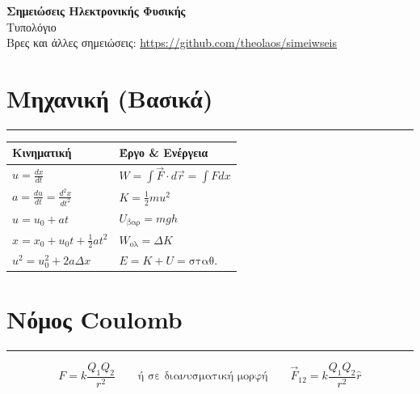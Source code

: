 \documentclass[a4paper,12pt]{article}
\begin{document}
\begin{center}
    \LARGE \textbf{Σημειώσεις Ηλεκτρονικής Φυσικής}\\[0.5ex]
    \large Τυπολόγιο \\
    \normalsize Βρες και άλλες σημειώσεις: \url{https://github.com/theolaos/simeiwseis}
\end{center}

\section*{Μηχανική (Βασικά)}
\vspace{-.4cm}
\hrule
\vspace{0.3cm}

\begin{table}[h!]
\centering
\begin{tabular}{|l|l|}
\hline
\textbf{Κινηματική} & \textbf{Έργο \& Ενέργεια} \\ \hline
$u = \frac{dx}{dt}$ & $W = \int \vec{F} \cdot d\vec{r} = \int F dx$ \\
$a = \frac{du}{dt} = \frac{d^2x}{dt^2}$ & $K = \frac{1}{2}m u^2$ \\
$u = u_0 + at$ & $U_{\text{βαρ}} = mgh$ \\
$x = x_0 + u_0 t + \frac{1}{2}at^2$ & $W_{\text{ολ}} = \Delta K$ \\
$u^2 = u_0^2 + 2a\Delta x$ & $E = K + U = \text{σταθ.}$ \\ \hline
\end{tabular}
\end{table}

\section*{Νόμος Coulomb}
\vspace{-.4cm}
\hrule
\vspace{0.3cm}

\begin{equation*}
    F = k \frac{Q_1 Q_2}{r^2} \qquad \text{ή σε διανυσματική μορφή} \qquad \vec{F}_{12} = k \frac{Q_1 Q_2}{r^2} \hat{r}
\end{equation*}

\vspace{0.3cm}
\end{document}
